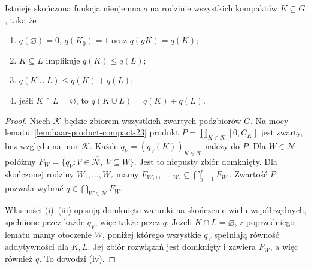 \begin{lemat}
\label{lem:haar-content-23}
Istnieje skończona funkcja nieujemna $q$ na rodzinie
wszystkich kompaktów $K\subseteq G$, taka że
\begin{enumerate}[label=(\roman*)]
\item $q(\varnothing)=0$, $q(K_0)=1$ oraz $q(gK)=q(K)$;
\item $K\subseteq L$ implikuje $q(K)\le q(L)$;
\item $q(K\cup L)\le q(K)+q(L)$;
\item jeśli $K\cap L=\varnothing$, to
      $q(K\cup L)=q(K)+q(L)$.
\end{enumerate}
\end{lemat}
\begin{proof}
Niech $\mathcal K$ będzie zbiorem wszystkich zwartych
podzbiorów $G$. Na mocy
lematu~\ref{lem:haar-product-compact-23} produkt
$P=\prod_{K\in\mathcal K}[0,C_K]$ jest zwarty,
bez względu na moc $\mathcal K$.
Każde $q_V=(q_V(K))_{K\in\mathcal K}$ należy do $P$.
Dla $W\in\mathcal N$ połóżmy
$F_W=\overline{\{q_V:V\in\mathcal N,\ V\subseteq W\}}$.
Jest to niepusty zbiór domknięty. Dla skończonej
rodziny $W_1,\dots,W_r$ mamy
$F_{W_1\cap\dots\cap W_r}\subseteq\bigcap_{j=1}^rF_{W_j}$.
Zwartość $P$ pozwala wybrać
$q\in\bigcap_{W\in\mathcal N}F_W$.

Własności (i)--(iii) opisują domknięte warunki na
skończenie wielu współrzędnych, spełnione przez
każde $q_V$, więc także przez $q$.
Jeżeli $K\cap L=\varnothing$, z poprzedniego lematu
mamy otoczenie $W$, poniżej którego wszystkie $q_V$
spełniają równość addytywności dla $K,L$.
Jej zbiór rozwiązań jest domknięty i zawiera $F_W$,
a więc również $q$. To dowodzi (iv).
\end{proof}

